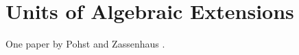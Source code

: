 \chapter{Units of Algebraic Extensions}
\label{Units:Chap}

One paper by Pohst and Zassenhaus \cite{Pohst77}. 
